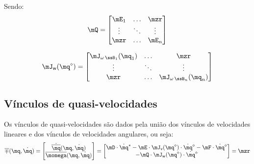 \documentclass[]{politex}
\begin{document}
Sendo:
\begin{equation}
\mQ = \begin{bmatrix}
\mE_1 & \ldots & \mzr\\
\vdots & \ddots & \vdots\\
\mzr &\ldots  & \mE_{n}
\end{bmatrix}
\end{equation}

\begin{equation} \label{eq:VinculosGenericosVelocidadesAngulares}
\mJ_{\mathsf{w}}(\mq^\diamond) =
\begin{bmatrix}
\mJ_{\omega\,\ssB_1}(\mq_1) & \ldots & \mzr\\
\vdots & \ddots & \vdots\\
\mzr &\ldots  & \mJ_{\omega\,\ssB_n}(\mq_n)
\end{bmatrix}
\end{equation}

\subsection{Vínculos de quasi-velocidades} 

Os vínculos de quasi-velocidades são dados pela união dos vínculos de velocidades lineares e dos vínculos de velocidades angulares, ou seja:
\begin{equation} \label{eq:VinculosQuasiVel}
\overline{\mp}(\mq,\dot{\mq}) = \begin{bmatrix}
\dot{\overline{\mq}}(\mq,\dot{\mq}) \\
\overline{\momega}(\mq,\dot{\mq})
\end{bmatrix}
= 
\begin{bmatrix}
\mD \cdot \dot{\mq}^\ast  - \mE \cdot \mJ_{\mathsf{v}}(\mq^\diamond) \cdot \dot{\mq}^\diamond  - \mF \cdot \dot{\mq}^\diamond \\
 - \mQ \cdot \mJ_{\mathsf{w}}(\mq^\diamond) \cdot \dot{\mq}^\diamond
\end{bmatrix}
=
\mzr
\end{equation}
\end{document}
